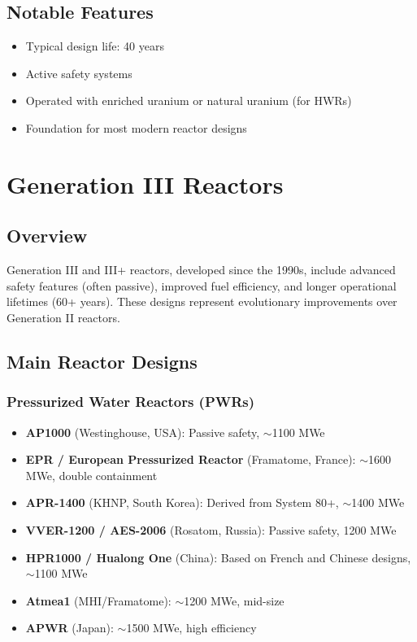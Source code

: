 \documentclass[a4paper,12pt]{article}
\begin{document}
\subsection{Notable Features}
\begin{itemize}
    \item Typical design life: 40 years
    \item Active safety systems
    \item Operated with enriched uranium or natural uranium (for HWRs)
    \item Foundation for most modern reactor designs
\end{itemize}

\section{Generation III Reactors}

\subsection{Overview}
Generation III and III+ reactors, developed since the 1990s, include advanced safety features (often passive), improved fuel efficiency, and longer operational lifetimes (60+ years). These designs represent evolutionary improvements over Generation II reactors.

\subsection{Main Reactor Designs}

\subsubsection{Pressurized Water Reactors (PWRs)}
\begin{itemize}
    \item \textbf{AP1000} (Westinghouse, USA): Passive safety, $\sim$1100 MWe
    \item \textbf{EPR / European Pressurized Reactor} (Framatome, France): $\sim$1600 MWe, double containment
    \item \textbf{APR-1400} (KHNP, South Korea): Derived from System 80+, $\sim$1400 MWe
    \item \textbf{VVER-1200 / AES-2006} (Rosatom, Russia): Passive safety, 1200 MWe
    \item \textbf{HPR1000 / Hualong One} (China): Based on French and Chinese designs, $\sim$1100 MWe
    \item \textbf{Atmea1} (MHI/Framatome): $\sim$1200 MWe, mid-size
    \item \textbf{APWR} (Japan): $\sim$1500 MWe, high efficiency
\end{itemize}
\end{document}
